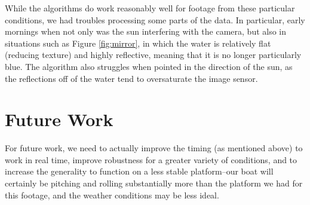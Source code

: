\documentclass{article}
\begin{document}
While the algorithms do work reasonably well for footage from these particular
conditions, we had troubles processing some parts of the data. In particular,
early mornings when not only was the sun interfering with the camera,
but also in situations such as Figure \ref{fig:mirror}, in which the water is
relatively flat (reducing texture) and highly reflective, meaning that it is no
longer particularly blue. The algorithm also struggles when pointed in the
 direction of the sun, as the reflections off of the water tend to oversaturate the image sensor.

\section{Future Work}

For future work, we need to actually improve the timing (as mentioned above) to
work in real time, improve robustness for a greater variety of conditions, and
to increase the generality to function on a less stable platform--our boat will
certainly be pitching and rolling substantially more than the platform we had
for this footage, and the weather conditions may be less ideal.



\end{document}
